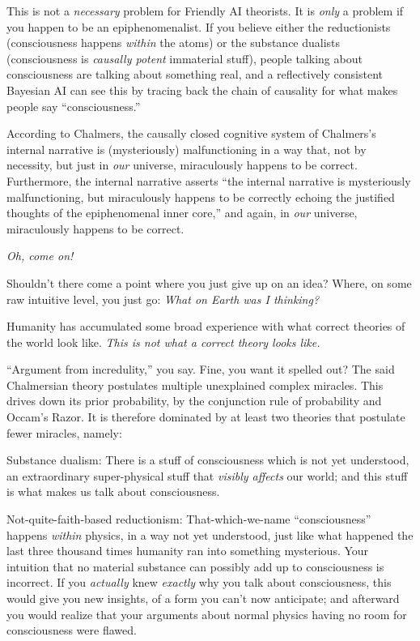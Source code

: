 {
 This is not a \textit{necessary} problem for Friendly AI
theorists. It is \textit{only} a problem if you happen to be an
epiphenomenalist. If you believe either the reductionists
(consciousness happens \textit{within} the atoms) or the substance
dualists (consciousness is \textit{causally potent} immaterial stuff),
people talking about consciousness are talking about something real,
and a reflectively consistent Bayesian AI can see this by tracing back
the chain of causality for what makes people say
``consciousness.''}

{
 According to Chalmers, the causally closed cognitive system of
Chalmers's internal narrative is (mysteriously)
malfunctioning in a way that, not by necessity, but just in
\textit{our} universe, miraculously happens to be correct. Furthermore,
the internal narrative asserts ``the internal
narrative is mysteriously malfunctioning, but miraculously happens to
be correctly echoing the justified thoughts of the epiphenomenal inner
core,'' and again, in \textit{our} universe,
miraculously happens to be correct.}

{
 \textit{Oh, come on!}}

{
 Shouldn't there come a point where you just give
up on an idea? Where, on some raw intuitive level, you just go:
\textit{What on Earth was I thinking?}}

{
 Humanity has accumulated some broad experience with what correct
theories of the world look like. \textit{This is not what a correct
theory looks like.}}

{
 ``Argument from incredulity,''
you say. Fine, you want it spelled out? The said Chalmersian theory
postulates multiple unexplained complex miracles. This drives down its
prior probability, by the conjunction rule of probability and
Occam's Razor. It is therefore dominated by at least
two theories that postulate fewer miracles, namely:}

{
 Substance dualism: There is a stuff of consciousness which is not
yet understood, an extraordinary super-physical stuff that
\textit{visibly affects} our world; and this stuff is what makes us
talk about consciousness. }

{
  Not-quite-faith-based reductionism: That-which-we-name
``consciousness'' happens
\textit{within} physics, in a way not yet understood, just like what
happened the last three thousand times humanity ran into something
mysterious. Your intuition that no material substance can possibly add
up to consciousness is incorrect. If you \textit{actually} knew
\textit{exactly} why you talk about consciousness, this would give you
new insights, of a form you can't now anticipate; and
afterward you would realize that your arguments about normal physics
having no room for consciousness were flawed. }

